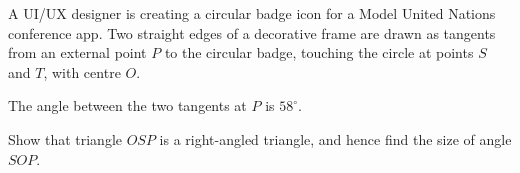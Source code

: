\begin{question}
\noindent A UI/UX designer is creating a circular badge icon for a Model United Nations conference app. Two straight edges of a decorative frame are drawn as tangents from an external point $P$ to the circular badge, touching the circle at points $S$ and $T$, with centre $O$.

The angle between the two tangents at $P$ is $58^\circ$.

\begin{center}
\end{center}

\noindent Show that triangle $OSP$ is a right-angled triangle, and hence find the size of angle $SOP$.

\vspace{5cm}

\begin{flushright}
\end{flushright}
\end{question}
